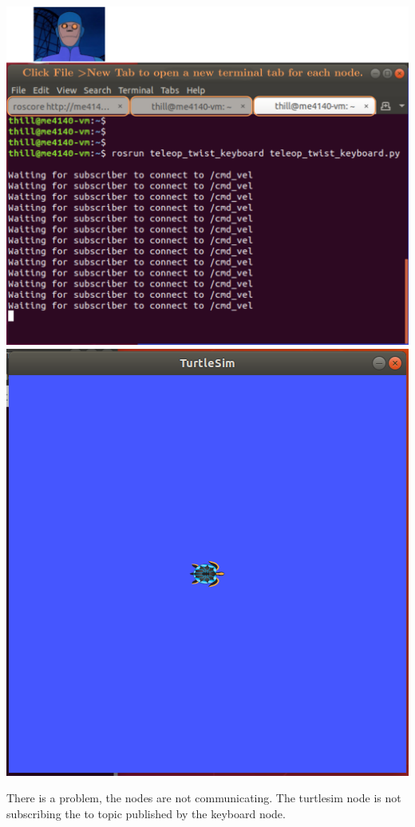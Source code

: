 \documentclass[12pt]{article}
\begin{document}
\begin{description}
\begin{enumerate}
\includegraphics[scale=0.4]{tutorial3_fig3.png}	
\includegraphics[scale=0.4]{tutorial3_fig2.png}	

There is a problem, the nodes are not communicating. The turtlesim node is not subscribing the to topic published by the keyboard node. \vspace{3mm}\\



\end{enumerate}
\end{description}
\end{document}

